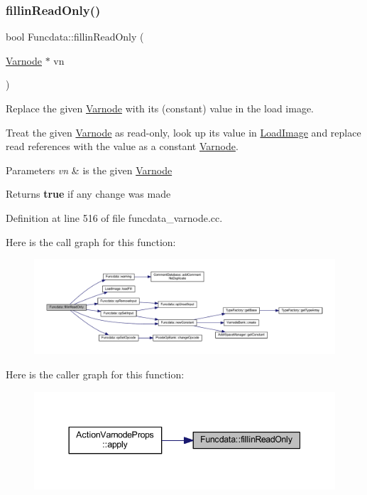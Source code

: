 \subsubsection{\texorpdfstring{fillinReadOnly()}{fillinReadOnly()}}
{\footnotesize\ttfamily bool Funcdata\+::fillin\+Read\+Only (\begin{DoxyParamCaption}\item[{\mbox{\hyperlink{class_varnode}{Varnode}} $\ast$}]{vn }\end{DoxyParamCaption})}



Replace the given \mbox{\hyperlink{class_varnode}{Varnode}} with its (constant) value in the load image. 

Treat the given \mbox{\hyperlink{class_varnode}{Varnode}} as read-\/only, look up its value in \mbox{\hyperlink{class_load_image}{Load\+Image}} and replace read references with the value as a constant \mbox{\hyperlink{class_varnode}{Varnode}}. 
\begin{DoxyParams}{Parameters}
{\em vn} & is the given \mbox{\hyperlink{class_varnode}{Varnode}} \\
\hline
\end{DoxyParams}
\begin{DoxyReturn}{Returns}
{\bfseries{true}} if any change was made 
\end{DoxyReturn}


Definition at line 516 of file funcdata\+\_\+varnode.\+cc.

Here is the call graph for this function\+:
\nopagebreak
\begin{figure}[H]
\begin{center}
\leavevmode
\includegraphics[width=350pt]{class_funcdata_af47b9524aee42c71c7dbe260a4052485_cgraph}
\end{center}
\end{figure}
Here is the caller graph for this function\+:
\nopagebreak
\begin{figure}[H]
\begin{center}
\leavevmode
\includegraphics[width=344pt]{class_funcdata_af47b9524aee42c71c7dbe260a4052485_icgraph}
\end{center}
\end{figure}
\mbox{\label{class_funcdata_a8fa3242779be4a766a37227deb728836}} 
